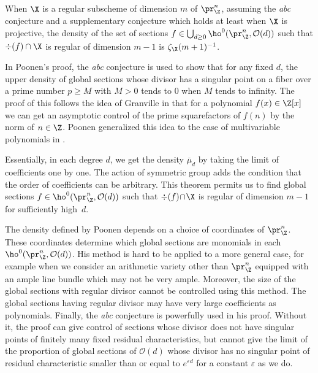 \begin{thm}\label{poonen}
When $\X$ is a regular subscheme of dimension $m$ of $\pr^n_{\Z}$, assuming the \emph{abc} conjecture and a supplementary conjecture which holds at least when $\X$ is projective, the density of the set of sections $f\in \bigcup_{d\geq 0}\ho^0(\pr^n_{\Z}, \mathcal{O}(d))$ such that $\div (f)\cap \X$ is regular of dimension $m-1$ is $\zeta_{\X}(m+1)^{-1}$.
\end{thm}

\begin{rmq}
In Poonen's proof, the \emph{abc} conjecture is used to show that for any fixed $d$, the upper density of global sections whose divisor has a singular point on a fiber over a prime number $p\geq M$ with $M>0$ tends to $0$ when $M$ tends to infinity. The proof of this follows the idea of Granville in \cite{Gr98} that for a polynomial $f(x)\in \Z[x]$ we can get an asymptotic control of the prime squarefactors of $f(n)$ by the norm of $n\in \Z$. Poonen generalized this idea to the case of multivariable polynomials in \cite{Po03}.
\end{rmq}

Essentially, in each degree $d$, we get the density $\overline{\mu}_d$ by taking the limit of coefficients one by one. The action of symmetric group adds the condition that the order of coefficients can be arbitrary. This theorem permits us to find global sections $f\in\ho^0(\pr^n_{\Z}, \mathcal{O}(d))$ such that $\div (f)\!\cap\!\X$ is regular of dimension $m\!-\!1$ for sufficiently high~$d$.

The density defined by Poonen depends on a choice of coordinates of $\pr^n_{\Z}$. These coordinates determine which global sections are monomials in each $\ho^0(\pr^n_{\Z}, \mathcal{O}(d))$. His method is hard to be applied to a more general case, for example when we consider an arithmetic variety other than $\pr^n_{\Z}$ equipped with an ample line bundle which may not be very ample. Moreover, the size of the global sections with regular divisor cannot be controlled using this method. The global sections having regular divisor may have very large coefficients as polynomials. Finally, the \emph{abc} conjecture is powerfully used in his proof. Without it, the proof can give control of sections whose divisor does not have singular points of finitely many fixed residual characteristics, but cannot give the limit of the proportion of global sections of $\mathcal{O}(d)$ whose divisor has no singular point of residual characteristic smaller than or equal to $e^{\varepsilon d}$ for a constant $\varepsilon $ as we do.


